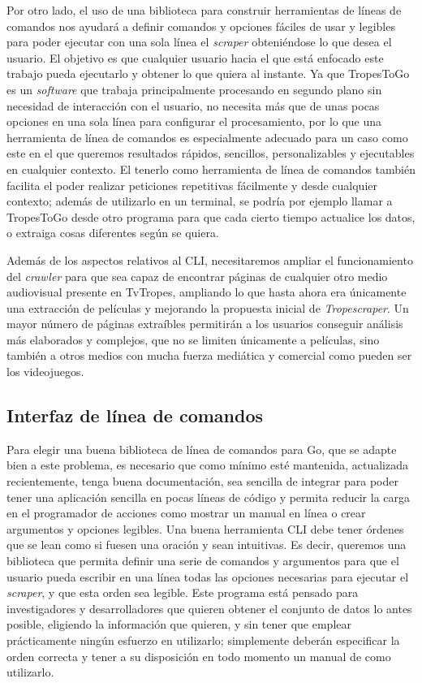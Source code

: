 Por otro lado, el uso de una biblioteca para construir herramientas de líneas de
comandos nos ayudará a definir comandos y opciones fáciles de usar y legibles
para poder ejecutar con una sola línea el \textit{scraper} obteniéndose lo que
desea el usuario. El objetivo es que cualquier usuario hacia el que está enfocado
este trabajo pueda ejecutarlo y obtener lo que quiera al instante. Ya que
TropesToGo es un \textit{software} que trabaja principalmente procesando en
segundo plano sin necesidad de interacción con el usuario, no necesita más que
de unas pocas opciones en una sola línea para configurar el procesamiento, por
lo que una herramienta de línea de comandos es especialmente adecuado para un
caso como este en el que queremos resultados rápidos, sencillos, personalizables
y ejecutables en cualquier contexto. El tenerlo como herramienta de línea de
comandos también facilita el poder realizar peticiones repetitivas fácilmente y
desde cualquier contexto; además de utilizarlo en un terminal, se podría por
ejemplo llamar a TropesToGo desde otro programa para que cada cierto tiempo
actualice los datos, o extraiga cosas diferentes según se quiera.

Además de los aspectos relativos al CLI, necesitaremos ampliar el
funcionamiento del \textit{crawler} para que sea capaz de encontrar páginas de
cualquier otro medio audiovisual presente en TvTropes, ampliando lo que hasta
ahora era únicamente una extracción de películas y mejorando la propuesta
inicial de \textit{Tropescraper}. Un mayor número de páginas extraíbles
permitirán a los usuarios conseguir análisis más elaborados y complejos, que no
se limiten únicamente a películas, sino también a otros medios con mucha fuerza
mediática y comercial como pueden ser los videojuegos.

\subsection{Interfaz de línea de comandos}
Para elegir una buena biblioteca de línea de comandos para Go, que se adapte
bien a este problema, es necesario que como mínimo esté mantenida, actualizada
recientemente, tenga buena documentación, sea sencilla de integrar para poder
tener una aplicación sencilla en pocas líneas de código y permita reducir la
carga en el programador de acciones como mostrar un manual en línea o crear
argumentos y opciones legibles. Una buena herramienta CLI debe tener órdenes que
se lean como si fuesen una oración y sean intuitivas. Es decir, queremos una
biblioteca que permita definir una serie de comandos y argumentos para que el
usuario pueda escribir en una línea todas las opciones necesarias para ejecutar
el \textit{scraper}, y que esta orden sea legible. Este programa está pensado
para investigadores y desarrolladores que quieren obtener el conjunto de datos
lo antes posible, eligiendo la información que quieren, y sin tener que emplear
prácticamente ningún esfuerzo en utilizarlo; simplemente deberán especificar la
orden correcta y tener a su disposición en todo momento un manual de como
utilizarlo.

